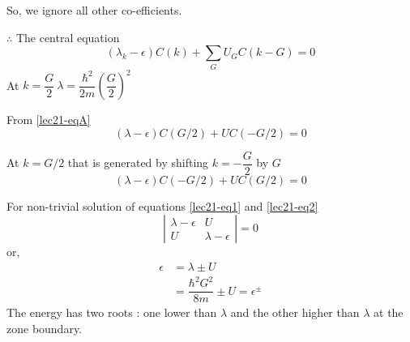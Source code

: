 So, we ignore all other co-efficients.

$\therefore$ The central equation 
\begin{equation*}
(\lambda_{k}-\epsilon)C(k)+\sum\limits_{G}U_{G}C(k-G)=0\tag{A}\label{lec21-eqA}
\end{equation*}
At $k=\dfrac{G}{2} \ \lambda = \dfrac{\hbar^{2}}{2m}\left(\dfrac{G}{2}\right)^{2}$

From \eqref{lec21-eqA}
\begin{equation*}
(\lambda-\epsilon)C(G/2)+UC(-G/2)=0\tag{1}\label{lec21-eq1}
\end{equation*}

At $k=G/2$ that is generated by shifting $k=-\dfrac{G}{2}$ by $G$
\begin{equation*}
(\lambda-\epsilon)C(-G/2)+UC(G/2)=0\tag{2}\label{lec21-eq2}
\end{equation*}

For non-trivial solution of equations \eqref{lec21-eq1} and \eqref{lec21-eq2}
$$
\left|
\begin{array}{cc}
\lambda-\epsilon & U\\
U & \lambda-\epsilon
\end{array}
\right|=0
$$
or,
\begin{align*}
\epsilon &= \lambda\pm U\\
&= \dfrac{\hbar^{2}G^{2}}{8m}\pm U=\epsilon^{\pm}
\end{align*}
The energy has two roots : one lower than $\lambda$ and the other higher than $\lambda$ at the zone boundary.

